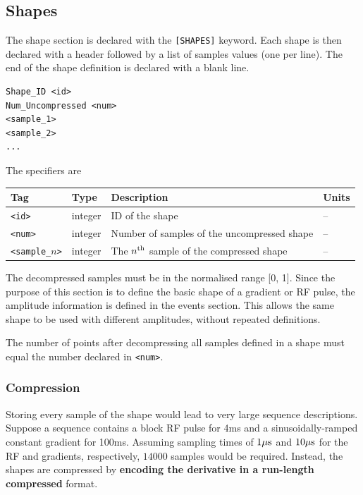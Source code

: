 \documentclass{article}
\begin{document}
\subsection{Shapes}

The shape section is declared with the \verb.[SHAPES]. keyword. Each shape is then declared with a header followed by a list of samples values (one per line). The end of the shape definition is declared with a blank line.

\begin{lstlisting}
Shape_ID <id>
Num_Uncompressed <num>
<sample_1>
<sample_2>
...
\end{lstlisting}

The specifiers are

\begin{tabularx}{\textwidth}{llXl}
\toprule
Tag & Type & Description & Units\\
\midrule
\verb.<id>. & integer & ID of the shape & -- \\
\verb.<num>. & integer & Number of samples of the uncompressed shape & -- \\
\verb.<sample_.$n$\verb.>. & integer & The $n^{\rm th}$ sample of the compressed shape  & -- \\
\bottomrule
\end{tabularx}

The decompressed samples must be in the normalised range [0, 1]. Since the purpose of this section is to define the basic shape of a gradient or RF pulse, the amplitude information is defined in the events section. This allows the same shape to be used with different amplitudes, without repeated definitions.

The number of points after decompressing all samples defined in a shape must equal the number declared in \verb.<num>..

\subsubsection{Compression}

Storing every sample of the shape would lead to very large sequence descriptions. Suppose a sequence contains a block RF pulse for 4ms and a sinusoidally-ramped constant gradient for 100ms. Assuming sampling times of $1{\rm \mu s}$ and $10{\rm \mu s}$ for the RF and gradients, respectively, $14000$ samples would be required. Instead, the shapes are compressed by \textbf{encoding the derivative in a run-length compressed} format. 
\end{document}
